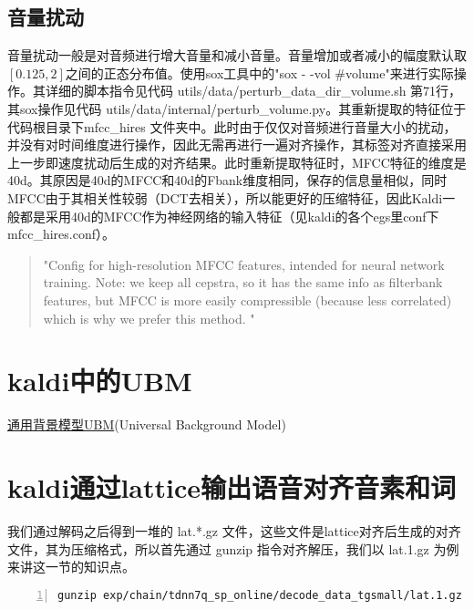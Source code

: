 \subsection{音量扰动}
音量扰动一般是对音频进行增大音量和减小音量。音量增加或者减小的幅度默认取$[0.125, 2]$之间的正态分布值。使用sox工具中的"sox - -vol #volume"来进行实际操作。其详细的脚本指令见代码 utils/data/perturb\_data\_dir\_volume.sh 第71行，其sox操作见代码 utils/data/internal/perturb\_volume.py。其重新提取的特征位于代码根目录下mfcc\_hires 文件夹中。此时由于仅仅对音频进行音量大小的扰动，并没有对时间维度进行操作，因此无需再进行一遍对齐操作，其标签对齐直接采用上一步即速度扰动后生成的对齐结果。此时重新提取特征时，MFCC特征的维度是40d。其原因是40d的MFCC和40d的Fbank维度相同，保存的信息量相似，同时MFCC由于其相关性较弱（DCT去相关），所以能更好的压缩特征，因此Kaldi一般都是采用40d的MFCC作为神经网络的输入特征（见kaldi的各个egs里conf下mfcc\_hires.conf）。
\begin{quotation}
"Config for high-resolution MFCC features, intended for neural network training. Note: we keep all cepstra, so it has the same info as filterbank features, but MFCC is more easily compressible (because less correlated) which is why we prefer this method. "
\end{quotation}

\section{kaldi中的UBM}

\href{http://citeseerx.ist.psu.edu/viewdoc/download?doi=10.1.1.117.338&rep=rep1&type=pdf}{通用背景模型UBM}(Universal Background Model)

\section{kaldi通过lattice输出语音对齐音素和词}

我们通过解码之后得到一堆的 lat.*.gz 文件，这些文件是lattice对齐后生成的对齐文件，其为压缩格式，所以首先通过 gunzip 指令对齐解压，我们以 lat.1.gz 为例来讲这一节的知识点。
\begin{lstlisting}[language=shell, numbers=left, 
         numberstyle=\tiny,keywordstyle=\color{blue!70},
         commentstyle=\color{red!50!green!50!blue!50},frame=shadowbox,
         rulesepcolor=\color{red!20!green!20!blue!20},basicstyle=\ttfamily]
gunzip exp/chain/tdnn7q_sp_online/decode_data_tgsmall/lat.1.gz
\end{lstlisting}

